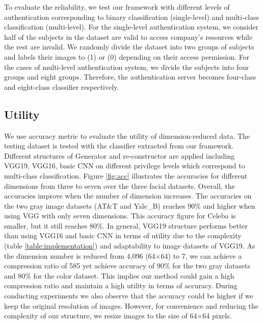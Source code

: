 To evaluate the reliability, we test our framework with different levels of authentication corresponding to binary classification (single-level) and multi-class classification (multi-level). For the single-level authentication system, we consider half of the subjects in the dataset are valid to access company's resources while the rest are invalid. We randomly divide the dataset into two groups of subjects and labels their images to (1) or (0) depending on their access permission. For the cases of multi-level authentication system, we divide the subjects into four groups and eight groups. Therefore, the authentication server becomes four-class and eight-class classifier respectively. 
\subsection{Utility}
We use accuracy metric to evaluate the utility of dimension-reduced data. The testing dataset is tested with the classifier extracted from our framework. Different structures of Generator and re-constructor are applied including VGG19, VGG16, basic CNN on different privilege levels which correspond to multi-class classification. Figure \ref{fig:acc} illustrates the accuracies for different dimensions from three to seven over the three facial datasets. Overall, the accuracies improve when the number of dimension increases. The accuracies on the two gray image datasets (AT\&T and Yale\_B) reaches 90\% and higher when using VGG with only seven dimensions. This accuracy figure for Celeba is smaller, but it still reaches 80\%. In general, VGG19 structure performs better than using VGG16 and basic CNN in terms of utility due to the complexity (table \ref{table:implementation}) and adaptability to image datasets of VGG19. As the dimension number is reduced from 4,096 (64$\times$64) to 7, we can achieve a compression ratio of 585 yet achieve accuracy of 90\% for the two gray datasets and 80\% for the color dataset. This implies our method could gain a high compression ratio and maintain a high utility in terms of accuracy. During conducting experiments we also observe that the accuracy could be higher if we keep the original resolution of images. However, for convenience and reducing the complexity of our structure, we resize images to the size of 64$\times$64 pixels.    

